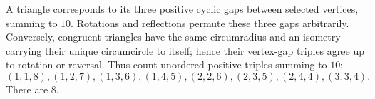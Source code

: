 A triangle corresponds to its three positive cyclic gaps between selected vertices, summing to $10$. Rotations and reflections permute these three gaps arbitrarily. Conversely, congruent triangles have the same circumradius and an isometry carrying their unique circumcircle to itself; hence their vertex-gap triples agree up to rotation or reversal. Thus count unordered positive triples summing to $10$:
\[(1,1,8),(1,2,7),(1,3,6),(1,4,5),(2,2,6),(2,3,5),(2,4,4),(3,3,4).\]
There are $\boxed8$.
